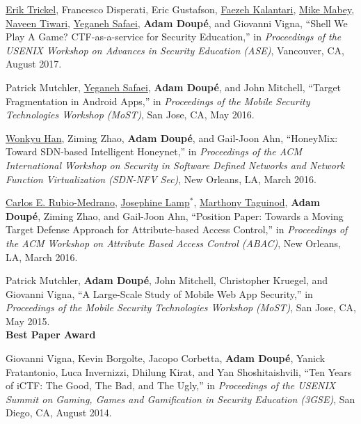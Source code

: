 \documentclass[11pt,letterpaper,sans]{moderncv}
\begin{document}
\begin{etaremune}
\item \underline{Erik Trickel}, Francesco Disperati, Eric Gustafson,
  \underline{Faezeh Kalantari}, \underline{Mike Mabey},
  \underline{Naveen Tiwari}, \underline{Yeganeh Safaei}, \textbf{Adam
    Doup\'e}, and Giovanni Vigna, ``Shell We Play A Game?
  CTF-as-a-service for Security Education,'' in \emph{Proceedings of
    the USENIX Workshop on Advances in Security Education (ASE)},
  Vancouver, CA, August 2017.

\item Patrick Mutchler, \underline{Yeganeh Safaei}, \textbf{Adam
  Doup\'e}, and John Mitchell, ``Target Fragmentation in Android
  Apps,'' in \emph{Proceedings of the Mobile Security Technologies
    Workshop (MoST)}, San Jose, CA, May 2016.

\item \underline{Wonkyu Han}, Ziming Zhao, \textbf{Adam Doup\'e}, and
  Gail-Joon Ahn, ``HoneyMix: Toward SDN-based Intelligent Honeynet,''
  in \emph{Proceedings of the ACM International Workshop on Security
    in Software Defined Networks and Network Function Virtualization
    (SDN-NFV Sec)}, New Orleans, LA, March 2016.

\item \underline{Carlos E. Rubio-Medrano}, \underline{Josephine
  Lamp}$^*$, \underline{Marthony Taguinod}, \textbf{Adam Doup\'e},
  Ziming Zhao, and Gail-Joon Ahn, ``Position Paper: Towards a Moving
  Target Defense Approach for Attribute-based Access Control,'' in
  \emph{Proceedings of the ACM Workshop on Attribute Based Access
    Control (ABAC)}, New Orleans, LA, March 2016.

\item Patrick Mutchler, \textbf{Adam Doup\'e}, John Mitchell,
  Christopher Kruegel, and Giovanni Vigna, ``A Large-Scale Study of
  Mobile Web App Security,'' in \emph{Proceedings of the Mobile
    Security Technologies Workshop (MoST)}, San Jose, CA, May 2015. \\
  \textbf{Best Paper Award}

\item Giovanni Vigna, Kevin Borgolte, Jacopo Corbetta, \textbf{Adam
  Doup\'e}, Yanick Fratantonio, Luca Invernizzi, Dhilung Kirat, and
  Yan Shoshitaishvili, ``Ten Years of iCTF: The Good, The Bad, and The
  Ugly,'' in \emph{Proceedings of the USENIX Summit on Gaming, Games
  and Gamification in Security Education (3GSE)}, San Diego, CA, August
  2014.

\end{etaremune}
\end{document}
